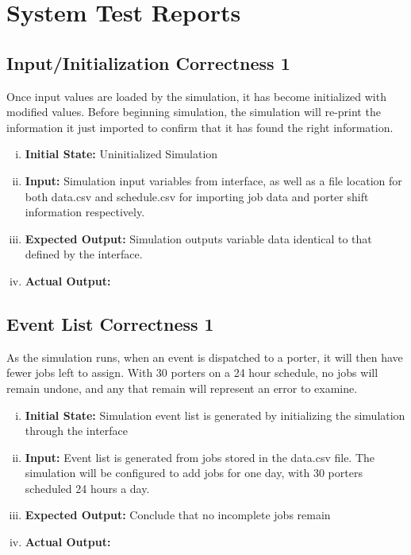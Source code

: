 \documentclass[paper=letter, fontsize=10pt]{scrartcl}
\numberwithin{equation}{section}		%
\numberwithin{figure}{section}			%
\numberwithin{table}{section}				%
\begin{document}
\section{System Test Reports}
\subsection{Input/Initialization Correctness 1}
Once input values are loaded by the simulation, it has become initialized with modified values. Before beginning simulation, the simulation will re-print the information it just imported to confirm that it has found the right information.
\begin{enumerate}[(i)]
	\item \textbf{Initial State:} Uninitialized Simulation   
	\item \textbf{Input:} Simulation input variables from interface, as well as a file location for both data.csv and schedule.csv for importing job data and porter shift information respectively.
	\item \textbf{Expected Output:} Simulation outputs variable data identical to that defined by the interface.
	\item \textbf{Actual Output:} 
\end{enumerate}

\subsection{Event List Correctness 1}
As the simulation runs, when an event is dispatched to a porter, it will then have fewer jobs left to assign. With 30 porters on a 24 hour schedule, no jobs will remain undone, and any that remain will represent an error to examine.
\begin{enumerate}[(i)]
	\item \textbf{Initial State:} Simulation event list is generated by initializing the simulation through the interface
	\item \textbf{Input:} Event list is generated from jobs stored in the data.csv file. The simulation will be configured to add jobs for one day, with 30 porters scheduled 24 hours a day.
	\item \textbf{Expected Output:} Conclude that no incomplete jobs remain
	\item \textbf{Actual Output:}
\end{enumerate}
\end{document}
